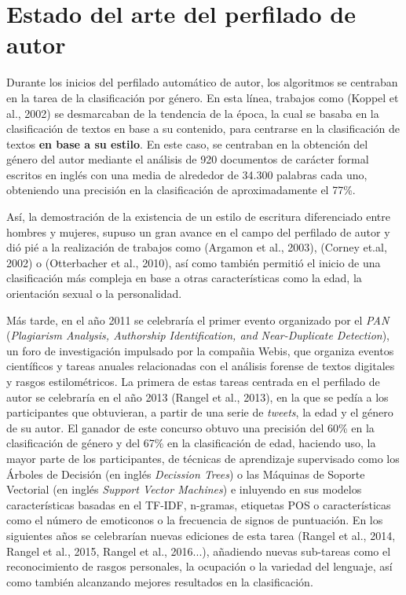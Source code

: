 \chapter{Estado del arte del perfilado de autor}
\label{chap:estadoarte}

Durante los inicios del perfilado automático de autor, los algoritmos se centraban en la tarea de la clasificación por género.
En esta línea, trabajos como (Koppel et al., 2002)\cite{koppel2002automatically} se desmarcaban de la tendencia de la época,
la cual se basaba en la clasificación de textos en base a su contenido, para centrarse en la clasificación de textos \textbf{en base a su estilo}. En este caso, se centraban en la obtención del género del autor mediante el análisis
de 920 documentos de carácter formal escritos en inglés con una media de alrededor de 34.300 palabras cada uno, obteniendo una precisión en la clasificación de
aproximadamente el 77\%.

\bigskip
Así, la demostración de la existencia de un estilo de escritura diferenciado entre hombres y mujeres, supuso un gran avance en el campo del perfilado de autor
y dió pié a la realización de trabajos como (Argamon et al., 2003)\cite{argamon2003gender}, (Corney et.al, 2002)\cite{corney2002gender} o (Otterbacher et al., 2010)\cite{otterbacher2010inferring}, 
así como también permitió el inicio de una clasificación más compleja en base a otras características como la edad, la orientación sexual o la personalidad.

\bigskip
Más tarde, en el año 2011 se celebraría el primer evento organizado por el \textit{PAN} (\textit{Plagiarism Analysis, Authorship Identification, and Near-Duplicate Detection}),
un foro de investigación impulsado por la compañia Webis, que organiza eventos científicos y tareas anuales relacionadas con el análisis forense de textos digitales
y rasgos estilométricos. La primera de estas tareas centrada en el perfilado de autor se celebraría en el año 2013 (Rangel et al., 2013)\cite{rangel2013overview},
en la que se pedía a los participantes que obtuvieran, a partir de una serie de \textit{tweets}, la edad y el género de su autor. El ganador de este concurso obtuvo una
precisión del 60\% en la clasificación de género y del 67\% en la clasificación de edad, haciendo uso, la mayor parte de los participantes, de técnicas de aprendizaje
supervisado como los Árboles de Decisión (en inglés \textit{Decission Trees}) o las Máquinas de Soporte Vectorial (en inglés \textit{Support Vector Machines}) e inluyendo
en sus modelos características basadas en el TF-IDF, n-gramas, etiquetas POS o características como el número de emoticonos o la frecuencia de signos de puntuación.
En los siguientes años se celebrarían nuevas ediciones de esta tarea (Rangel et al., 2014\cite{rangel2014overview}, Rangel et al., 2015\cite{rangel2015overview},
Rangel et al., 2016\cite{rangel2016overview}...), añadiendo nuevas sub-tareas como el reconocimiento de rasgos personales, la ocupación o la variedad del lenguaje,
así como también alcanzando mejores resultados en la clasificación.

